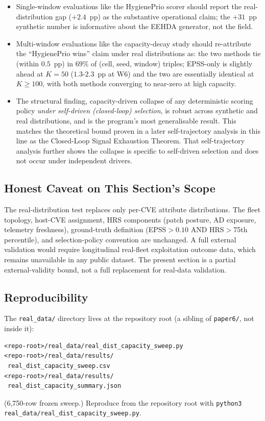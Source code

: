 \begin{itemize}
\item Single-window evaluations like the HygienePrio scorer should report the
real-distribution gap ($+2.4$~pp) as the substantive operational claim;
the $+31$~pp synthetic number is informative about the EEHDA
generator, not the field.

\item Multi-window evaluations like the capacity-decay study should re-attribute the
``HygienePrio wins'' claim under real distributions as: the two
methods tie (within $0.5$~pp) in $69\%$ of (cell, seed, window)
triples; EPSS-only is slightly ahead at $K = 50$ ($1.3$-$2.3$~pp at
W6) and the two are essentially identical at $K \geq 100$, with both
methods converging to near-zero at high capacity.

\item The structural finding, capacity-driven collapse of any
deterministic scoring policy \emph{under self-driven (closed-loop)
selection}, is robust across synthetic and real distributions,
and is the program's most generalisable result. This matches the
theoretical bound proven in a later self-trajectory analysis in this line as the
Closed-Loop Signal Exhaustion Theorem. That self-trajectory analysis
further shows the collapse is specific to self-driven selection and
does not occur under independent drivers.
\end{itemize}

\subsection{Honest Caveat on This Section's Scope}

The real-distribution test replaces only per-CVE attribute
distributions. The fleet topology, host-CVE assignment,
HRS components (patch posture, AD exposure, telemetry freshness),
ground-truth definition (EPSS$>0.10$ AND HRS$>$75th percentile),
and selection-policy convention are unchanged. A full external
validation would require longitudinal real-fleet exploitation
outcome data, which remains unavailable in any public dataset.
The present section is a partial external-validity bound, not a
full replacement for real-data validation.

\subsection{Reproducibility}

The \texttt{real\_data/} directory lives at the repository root
(a sibling of \texttt{paper6/}, not inside it):

{\small\begin{verbatim}
<repo-root>/real_data/real_dist_capacity_sweep.py
<repo-root>/real_data/results/
 real_dist_capacity_sweep.csv
<repo-root>/real_data/results/
 real_dist_capacity_summary.json
\end{verbatim}}
\noindent (6{,}750-row frozen sweep.) Reproduce from the repository
root with
\texttt{python3 real\_data/\allowbreak \allowbreak real\_dist\_capacity\_sweep.py}.
